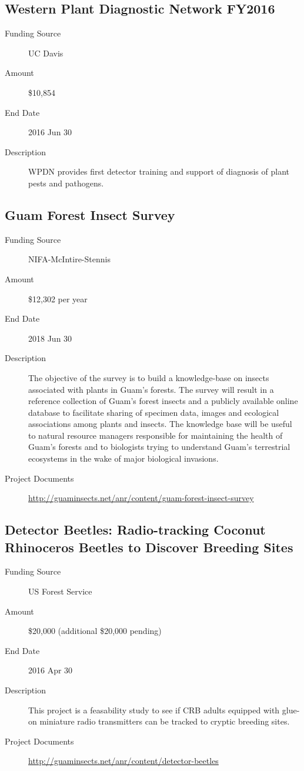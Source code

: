 \documentclass[12pt,oneside,english]{scrbook}
\begin{document}
\subsection{Western Plant Diagnostic Network FY2016}
\begin{description}
	\item[Funding Source] UC Davis
	\item[Amount] \$10,854
	\item[End Date] 2016 Jun 30
	\item[Description] WPDN provides first detector training and support of diagnosis of plant pests and pathogens. 
\end{description}

\subsection{Guam Forest Insect Survey}
\label{McIntire-Stennis}
\begin{description}
	\item[Funding Source] NIFA-McIntire-Stennis
	\item[Amount] \$12,302 per year
	\item[End Date] 2018 Jun 30
	\item[Description] The objective of the survey is to build a knowledge-base on insects associated
with plants in Guam's forests. The survey will result in a reference collection of Guam's
forest insects and a publicly available online database to facilitate sharing of specimen
data, images and ecological associations among plants and insects.
The knowledge base will be useful to natural resource managers responsible for maintaining the health of Guam's forests and to biologists trying to understand Guam's
terrestrial ecosystems in the wake of major biological invasions.
	\item[Project Documents] \url{http://guaminsects.net/anr/content/guam-forest-insect-survey}
\end{description}

\subsection{Detector Beetles: Radio-tracking Coconut Rhinoceros Beetles to Discover Breeding Sites}
\begin{description}
	\item[Funding Source] US Forest Service
	\item[Amount] \$20,000 (additional \$20,000 pending)
	\item[End Date] 2016 Apr 30
	\item[Description] This project is a feasability study to see if CRB adults equipped with glue-on miniature radio transmitters can be tracked to cryptic breeding sites.
	\item[Project Documents] \url{http://guaminsects.net/anr/content/detector-beetles}
\end{description} 
\end{document}
